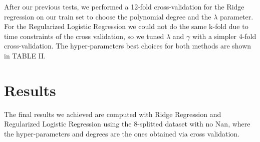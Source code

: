 \documentclass[10pt,article]{IEEEtran}
\begin{document}
After our previous tests, we performed a 12-fold cross-validation for the Ridge regression on our train set to choose the polynomial degree and the $\lambda$ parameter. For the Regularized Logistic Regression we could not do the same k-fold due to time constraints of the cross validation, so we tuned $\lambda$ and $\gamma$ with a simpler 4-fold cross-validation. The hyper-parameters best choices for both methods are shown in TABLE II.

\begin{table}[hbt]
\centering
\label{tab:hypersresults}
\caption{Hyper-parameters selection results}
\vspace{-0.5cm}
\end{table}
\FloatBarrier


\section{Results}
\label{sec:results}
The final results we achieved are computed with Ridge Regression and Regularized Logistic Regression using the 8-splitted dataset with no Nan, where the hyper-parameters and degrees are the ones obtained via cross validation. 
\end{document}
